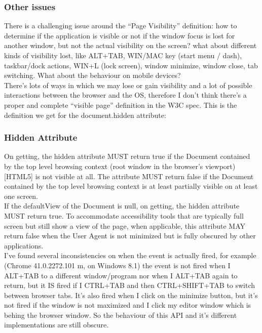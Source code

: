\documentclass[12pt]{report}
\begin{document}
\subsubsection{Other issues}
There is a challenging issue around the “Page Visibility” definition: how to determine if the application is visible or not if the window focus is lost for another window, but not the actual visibility on the screen? what about different kinds of visibility lost, like ALT+TAB, WIN/MAC key (start menu / dash), taskbar/dock actions, WIN+L (lock screen), window minimize, window close, tab switching. What about the behaviour on mobile devices?\\

There’s lots of ways in which we may lose or gain visibility and a lot of possible interactions between the browser and the OS, therefore I don’t think there’s a proper and complete “visible page” definition in the W3C spec. This is the definition we get for the document.hidden attribute:
\subsubsection{Hidden Attribute}
On getting, the hidden attribute MUST return true if the Document contained by the top level browsing context (root window in the browser’s viewport) [HTML5] is not visible at all. The attribute MUST return false if the Document contained by the top level browsing context is at least partially visible on at least one screen.\\

If the defaultView of the Document is null, on getting, the hidden attribute MUST return true.
To accommodate accessibility tools that are typically full screen but still show a view of the page, when applicable, this attribute MAY return false when the User Agent is not minimized but is fully obscured by other applications.\\

I’ve found several inconsistencies on when the event is actually fired, for example (Chrome 41.0.2272.101 m, on Windows 8.1) the event is not fired when I ALT+TAB to a different window/program nor when I ALT+TAB again to return, but it IS fired if I CTRL+TAB and then CTRL+SHIFT+TAB to switch between browser tabs. It’s also fired when I click on the minimize button, but it’s not fired if the window is not maximized and I click my editor window which is behing the browser window. So the behaviour of this API and it’s different implementations are still obscure.\\
\end{document}

